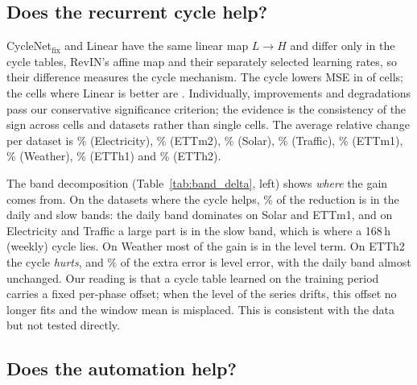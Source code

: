 \documentclass[11pt,a4paper]{article}
\begin{document}
\subsection{Does the recurrent cycle help?}
\label{sec:res-cycle}
CycleNet$_{\text{fix}}$ and Linear have the same linear map $L\to H$ and differ only in the cycle tables, RevIN's affine map and their separately selected learning rates, so their difference measures the cycle mechanism. The cycle lowers MSE in \vCycleWins{} of \vCycleCells{} cells; the \vCycleLosses{} cells where Linear is better are \vCycleLossWhere. Individually, \vCycleSigBetter{} improvements and \vCycleSigWorse{} degradations pass our conservative significance criterion; the evidence is the consistency of the sign across cells and datasets rather than single cells. The average relative change per dataset is \vCycleElectricity\% (Electricity), \vCycleETTmTwo\% (ETTm2), \vCycleSolar\% (Solar), \vCycleTraffic\% (Traffic), \vCycleETTmOne\% (ETTm1), \vCycleWeather\% (Weather), \vCycleETThOne\% (ETTh1) and \vCycleETThTwo\% (ETTh2).

The band decomposition (Table~\ref{tab:band_delta}, left) shows \emph{where} the gain comes from. On the datasets where the cycle helps, \vCycleGainDailySlowShare\% of the reduction is in the daily and slow bands: the daily band dominates on Solar and ETTm1, and on Electricity and Traffic a large part is in the slow band, which is where a 168\,h (weekly) cycle lies. On Weather most of the gain is in the level term. On ETTh2 the cycle \emph{hurts}, and \vCycleETThTwoLevelShare\% of the extra error is level error, with the daily band almost unchanged. Our reading is that a cycle table learned on the training period carries a fixed per-phase offset; when the level of the series drifts, this offset no longer fits and the window mean is misplaced. This is consistent with the data but not tested directly.

\begin{table}[t]
\centering
\scriptsize
\setlength{\tabcolsep}{3pt}

\caption{\textbf{Where differences come from.} Band decomposition of the MSE difference between two models, summed over the four horizons ($\times10^{-3}$; negative means the first model is better). Columns sum to the total up to rounding.}
\label{tab:band_delta}
\end{table}

\subsection{Does the automation help?}
\label{sec:res-auto}
\end{document}
